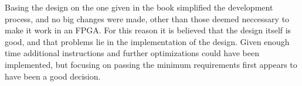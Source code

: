 Basing the design on the one given in the book simplified the development process, and no big changes were made, other than those deemed neccessary to make it work in an FPGA. For this reason it is believed that the design itself is good, and that problems lie in the implementation of the design. Given enough time additional instructions and further optimizations could have been implemented, but focusing on passing the minimum requirements first appears to have been a good decision.